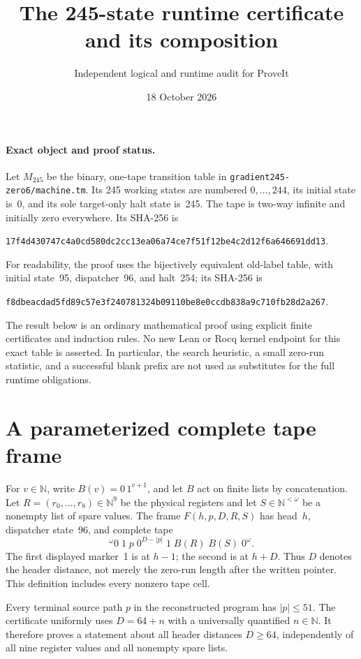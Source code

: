 \documentclass[11pt]{article}
\title{The 245-state runtime certificate and its composition}
\author{Independent logical and runtime audit for ProveIt}
\date{18 October 2026}
\begin{document}
\maketitle

\paragraph{Exact object and proof status.}
Let $M_{245}$ be the binary, one-tape transition table in
\texttt{gradient245-zero6/machine.tm}. Its 245 working states are numbered
$0,\ldots,244$, its initial state is~0, and its sole target-only halt state
is~245. The tape is two-way infinite and initially zero everywhere.
Its SHA-256 is
\begin{center}\small
\texttt{17f4d430747c4a0cd580dc2cc13ea06a74ce7f51f12be4c2d12f6a646691dd13}.
\end{center}
For readability, the proof uses the bijectively equivalent old-label table,
with initial state~95, dispatcher~96, and halt~254; its SHA-256 is
\begin{center}\small
\texttt{f8dbeacdad5fd89c57e3f240781324b09110be8e0ccdb838a9c710fb28d2a267}.
\end{center}
The result below is an ordinary mathematical proof using explicit finite
certificates and induction rules. No new Lean or Rocq kernel endpoint for
this exact table is asserted. In particular, the search heuristic, a small
zero-run statistic, and a successful blank prefix are not used as substitutes
for the full runtime obligations.

\section{A parameterized complete tape frame}

For $v\in\mathbb N$, write $B(v)=0\,1^{v+1}$, and let $B$ act on finite
lists by concatenation. Let $R=(r_0,\ldots,r_8)\in\mathbb N^9$ be the
physical registers and let $S\in\mathbb N^{<\omega}$ be a nonempty list of
spare values. The frame $F(h,p,D,R,S)$ has head~$h$, dispatcher state~96,
and complete tape
\[
 {}^\omega0\;1\;p\;0^{D-|p|}\;1\;B(R)\;B(S)\;0^\omega.
\]
The first displayed marker~1 is at $h-1$; the second is at $h+D$. Thus
$D$ denotes the header distance, not merely the zero-run length after the
written pointer. This definition includes every nonzero tape cell.

Every terminal source path $p$ in the reconstructed program has
$|p|\leq51$. The certificate uniformly uses $D=64+n$ with a universally
quantified $n\in\mathbb N$. It therefore proves a statement about all
header distances $D\geq64$, independently of all nine register values and
all nonempty spare lists.
\end{document}
